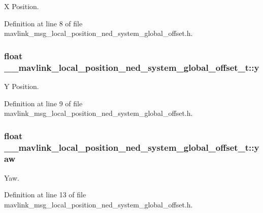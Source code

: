 X Position. 



Definition at line 8 of file mavlink\-\_\-msg\-\_\-local\-\_\-position\-\_\-ned\-\_\-system\-\_\-global\-\_\-offset.\-h.

\hypertarget{struct____mavlink__local__position__ned__system__global__offset__t_a475a296670eca737a98ff9c89f8289f8}{
\subsubsection[{y}]{\setlength{\rightskip}{0pt plus 5cm}float \-\_\-\-\_\-mavlink\-\_\-local\-\_\-position\-\_\-ned\-\_\-system\-\_\-global\-\_\-offset\-\_\-t\-::y}}\label{struct____mavlink__local__position__ned__system__global__offset__t_a475a296670eca737a98ff9c89f8289f8}


Y Position. 



Definition at line 9 of file mavlink\-\_\-msg\-\_\-local\-\_\-position\-\_\-ned\-\_\-system\-\_\-global\-\_\-offset.\-h.

\hypertarget{struct____mavlink__local__position__ned__system__global__offset__t_a2a919917ced7545167d6f588d6c8f0ef}{
\subsubsection[{yaw}]{\setlength{\rightskip}{0pt plus 5cm}float \-\_\-\-\_\-mavlink\-\_\-local\-\_\-position\-\_\-ned\-\_\-system\-\_\-global\-\_\-offset\-\_\-t\-::yaw}}\label{struct____mavlink__local__position__ned__system__global__offset__t_a2a919917ced7545167d6f588d6c8f0ef}


Yaw. 



Definition at line 13 of file mavlink\-\_\-msg\-\_\-local\-\_\-position\-\_\-ned\-\_\-system\-\_\-global\-\_\-offset.\-h.

